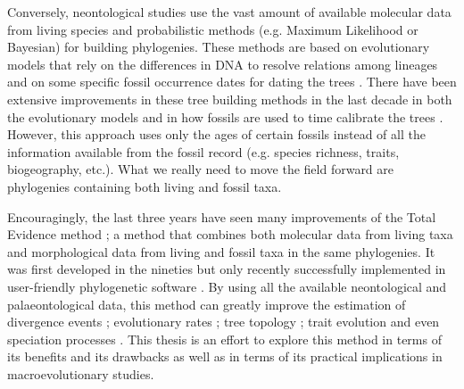 Conversely, neontological studies use the vast amount of available molecular data from living species and probabilistic methods (e.g. Maximum Likelihood or Bayesian) for building phylogenies.
These methods are based on evolutionary models that rely on the differences in DNA to resolve relations among lineages and on some specific fossil occurrence dates for dating the trees \citep[i.e. the molecular clock;][]{zuckerkandl1965}.
There have been extensive improvements in these tree building methods in the last decade in both the evolutionary models \citep[e.g.][]{bapsta2013,stadlerdating2013,heaththe2013} and in how fossils are used to time calibrate the trees \citep{Donoghue2007424,Parham01032012}.
However, this approach uses only the ages of certain fossils instead of all the information available from the fossil record (e.g. species richness, traits, biogeography, etc.).
What we really need to move the field forward are phylogenies containing both living and fossil taxa.

Encouragingly, the last three years have seen many improvements of the Total Evidence method \citep{ronquista2012,slaterphylogenetic2013,Wood01032013,schragocombining2013,beckancient2014,Arcila2015131,Dembo2015}; a method that combines both molecular data from living taxa and morphological data from living and fossil taxa in the same phylogenies.
It was first developed in the nineties \citep{eernissetaxonomic1993} but only recently successfully implemented in user-friendly phylogenetic software \citep{Ronquist2012mrbayes,BEAST2}.
By using all the available neontological and palaeontological data, this method can greatly improve the estimation of divergence events \citep[e.g.][]{ronquista2012}; evolutionary rates \citep[e.g.][]{beckancient2014}; tree topology \citep[e.g.][]{Dembo2015}; trait evolution \citep[e.g.][]{slaterphylogenetic2013} and even speciation processes \citep[e.g.][]{Wood01032013}.
This thesis is an effort to explore this method in terms of its benefits and its drawbacks as well as in terms of its practical implications in macroevolutionary studies.

